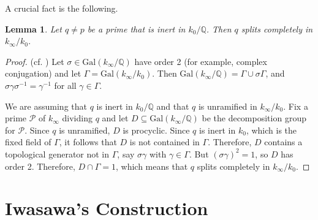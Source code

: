 \documentclass{amsart}
\newtheorem{lemma}[theorem]{Lemma}
\begin{document}
A crucial fact is the following.
\begin{lemma}\label{LemmaSplit} Let $q\ne p$ be a prime that is inert in $k_0/\mathbb Q$. Then $q$ splits completely in $k_{\infty}/k_0$.
\end{lemma}
\begin{proof} (cf. \cite[Lemma 10]{washthesis})
Let $\sigma\in \text{Gal}(k_{\infty}/\mathbb Q)$ have order 2 (for example, complex conjugation)
and let $\Gamma=\text{Gal}(k_{\infty}/k_0)$. Then $\text{Gal}(k_{\infty}/\mathbb Q) = \Gamma\cup \sigma\Gamma$, 
and $\sigma\gamma\sigma^{-1} = \gamma^{-1}$ for all $\gamma\in \Gamma$.

We are assuming that $q$ is inert in $k_0/\mathbb Q$ and that $q$ is unramified in $k_{\infty}/k_0$.
Fix a prime ${\mathcal{P}}$ of $k_{\infty}$ dividing $q$ and let $D\subseteq \text{Gal}(k_{\infty}/\mathbb Q)$ 
be the decomposition group for ${\mathcal{P}}$.  Since $q$ is unramified,
$D$ is procyclic.
Since $q$ is inert in $k_0$, which is the fixed field of $\Gamma$, it follows that $D$ is not contained in $\Gamma$.
Therefore, $D$ contains a topological generator not in $\Gamma$, say $\sigma\gamma$ with $\gamma\in \Gamma$.  
But $(\sigma\gamma)^2 = 1$, so $D$ has order 2. 
Therefore, $D\cap \Gamma=1$, which means that
$q$ splits completely in $k_{\infty}/k_0$. \end{proof}



\section{Iwasawa's Construction}
\end{document}
